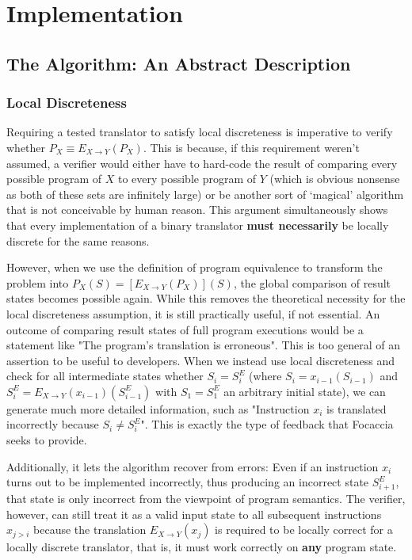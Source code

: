 \chapter{Implementation}\label{chapter:implementation}

\section{The Algorithm: An Abstract Description}

\subsection{Local Discreteness}\label{sec:impl:local_discreteness}

Requiring a tested translator to satisfy local discreteness is imperative to verify whether $P_X \equiv E_{X \rightarrow
Y}(P_X)$. This is because, if this requirement weren't assumed, a verifier would either have to hard-code the result of
comparing every possible program of $X$ to every possible program of $Y$ (which is obvious nonsense as both of these
sets are infinitely large) or be another sort of `magical' algorithm that is not conceivable by human reason. This
argument simultaneously shows that every implementation of a binary translator \textbf{must necessarily} be locally
discrete for the same reasons.

However, when we use the definition of program equivalence to transform the problem into $P_X(S) = [E_{X \rightarrow
Y}(P_X)](S)$, the global comparison of result states becomes possible again. While this removes the theoretical
necessity for the local discreteness assumption, it is still practically useful, if not essential. An outcome of
comparing result states of full program executions would be a statement like "The program's translation is erroneous".
This is too general of an assertion to be useful to developers. When we instead use local discreteness and check for all
intermediate states whether $S_i = S^E_i$ (where $S_i = x_{i-1}(S_{i-1})$ and $S^E_i = E_{X \rightarrow
Y}(x_{i-1})(S^E_{i-1})$ with $S_1 = S^E_1$ an arbitrary initial state), we can generate much more detailed information,
such as "Instruction $x_i$ is translated incorrectly because $S_i \neq S^E_i$". This is exactly the type of feedback
that Focaccia seeks to provide.

Additionally, it lets the algorithm recover from errors: Even if an instruction $x_i$ turns out to be implemented
incorrectly, thus producing an incorrect state $S^E_{i+1}$, that state is only incorrect from the viewpoint of program
semantics. The verifier, however, can still treat it as a valid input state to all subsequent instructions $x_{j > i}$
because the translation $E_{X \rightarrow Y}(x_j)$ is required to be locally correct for a locally discrete translator,
that is, it must work correctly on \textbf{any} program state.

